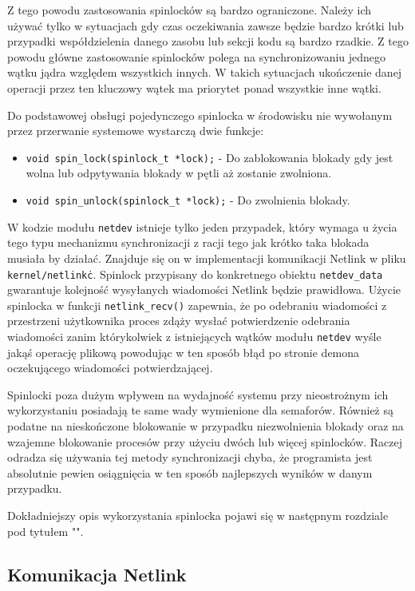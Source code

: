 \documentclass[10pt]{article}
\begin{document}
Z tego powodu zastosowania spinlocków są bardzo ograniczone. Należy ich używać tylko w sytuacjach gdy czas oczekiwania zawsze będzie bardzo krótki lub przypadki współdzielenia danego zasobu lub sekcji kodu są bardzo rzadkie. Z tego powodu główne zastosowanie spinlocków polega na synchronizowaniu jednego wątku jądra względem wszystkich innych. W takich sytuacjach ukończenie danej operacji przez ten kluczowy wątek ma priorytet ponad wszystkie inne wątki.

Do podstawowej obsługi pojedynczego spinlocka w środowisku nie wywołanym przez przerwanie systemowe wystarczą dwie funkcje:

\begin{itemize}
\itemsep1pt\parskip0pt
\item
  \texttt{void spin\_lock(spinlock\_t *lock);} - Do zablokowania blokady gdy jest wolna lub odpytywania blokady w pętli aż zostanie zwolniona.
\item
  \texttt{void spin\_unlock(spinlock\_t *lock);} - Do zwolnienia blokady.
\end{itemize}

W kodzie modułu \texttt{netdev} istnieje tylko jeden przypadek, który wymaga u życia tego typu mechanizmu synchronizacji z racji tego jak krótko taka blokada musiała by działać. Znajduje się on w implementacji komunikacji Netlink w pliku \texttt{kernel/netlink\.c}. Spinlock przypisany do konkretnego obiektu \texttt{netdev\_data} gwarantuje kolejność wysyłanych wiadomości Netlink będzie prawidłowa. Użycie spinlocka w funkcji \texttt{netlink\_recv()} zapewnia, że po odebraniu wiadomości z przestrzeni użytkownika proces zdąży wysłać potwierdzenie odebrania wiadomości zanim którykolwiek z istniejących wątków modułu \texttt{netdev} wyśle jakąś operację plikową powodując w ten sposób błąd po stronie demona oczekującego wiadomości potwierdzającej.

Spinlocki poza dużym wpływem na wydajność systemu przy nieostrożnym ich wykorzystaniu posiadają te same wady wymienione dla semaforów. Również są podatne na nieskończone blokowanie w przypadku niezwolnienia blokady oraz na wzajemne blokowanie procesów przy użyciu dwóch lub więcej spinlocków. Raczej odradza się używania tej metody synchronizacji chyba, że programista jest absolutnie pewien osiągnięcia w ten sposób najlepszych wyników w danym przypadku.

Dokładniejszy opis wykorzystania spinlocka pojawi się w następnym rozdziale pod tytułem "".

\subsection{Komunikacja Netlink}
\label{netlinkcomm}
\end{document}
